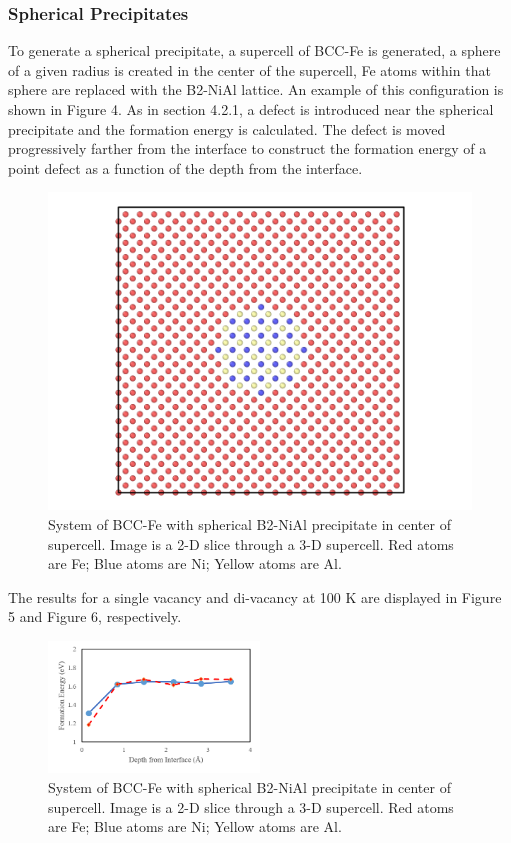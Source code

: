 \documentclass[review]{elsarticle}
\begin{document}
\subsubsection{Spherical Precipitates}
To generate a spherical precipitate, a supercell of BCC-Fe is generated, a sphere of a given radius is created in the center of the supercell, Fe atoms within that sphere are replaced with the B2-NiAl lattice.  An example of this configuration is shown in Figure 4.  As in section 4.2.1, a defect is introduced near the spherical precipitate and the formation energy is calculated.  The defect is moved progressively farther from the interface to construct the formation energy of a point defect as a function of the depth from the interface.

\begin{figure}[htp]
   \centering
   \includegraphics[width=\textwidth]{sphere_precip.png} 
   \caption{System of BCC-Fe with spherical B2-NiAl precipitate in center of supercell.  Image is a 2-D slice through a 3-D supercell.  Red atoms are Fe; Blue atoms are Ni; Yellow atoms are Al.}
   \label{fig:example}
\end{figure}

The results for a single vacancy and di-vacancy at 100 K are displayed in Figure 5 and Figure 6, respectively.  

\begin{figure}[htp]
   \centering
   \includegraphics[width=0.5\textwidth]{vac_sphere.png} 
   \caption{System of BCC-Fe with spherical B2-NiAl precipitate in center of supercell.  Image is a 2-D slice through a 3-D supercell.  Red atoms are Fe; Blue atoms are Ni; Yellow atoms are Al.}
   \label{fig:example}
\end{figure}
\end{document}
